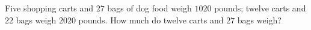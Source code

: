 Five shopping carts and $27$ bags of dog food weigh $1020$ pounds; twelve carts and $22$ bags weigh $2020$ pounds. How much do twelve carts and $27$ bags weigh?
